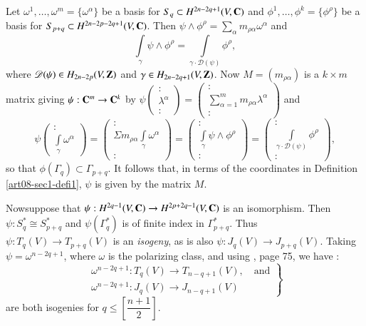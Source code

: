 Let $\omega^{1},\ldots,\omega^{m}=\{\omega^{\alpha}\}$ be a basis for $S_{q}\subset H^{2n-2q+1}(V,\mathbf{C})$ and $\phi^{1},\ldots,\phi^{k}=\{\phi^{\rho}\}$ be a basis for $S_{p+q}\subset H^{2n-2p-2q+1}(V,\mathbf{C})$. Then $\psi\wedge \phi^{\rho}=\sum\limits_{\alpha}m_{\rho\alpha}\omega^{\alpha}$ and 
\begin{equation}
\int\limits_{\gamma}\psi \wedge \phi^{\rho}=\int\limits_{\gamma\cdot \mathscr{D}(\psi)}\phi^{\rho},\label{art08-sec2-eq2.8}
\end{equation}
where $\mathscr{D}(\psi)\in H_{2n-2p}(V,\mathbf{Z})$ and $\gamma\in H_{2n-2q+1}(V,\mathbf{Z})$. Now $M=(m_{\rho\alpha})$ is a $k\times m$ matrix giving $\psi:\mathbf{C}^{m}\to \mathbf{C}^{k}$ by $\psi \left(\begin{smallmatrix} :\\ \lambda^{\alpha} \\ :\end{smallmatrix}\right)=\left(\begin{smallmatrix} :\\ \sum\limits^{m}_{\alpha=1} m_{\rho\alpha}\lambda^{\alpha}\\ :\end{smallmatrix}\right)$
 and
$$
\psi\left(\begin{matrix} 
:\\ \int\limits_{\gamma}\omega^{\alpha}
\end{matrix}\right)
=
\left(\begin{matrix}
:\\
\Sigma m_{\rho\alpha}\int\limits_{\gamma}\omega^{\alpha}\\
:
\end{matrix}\right)
=
\left(\begin{matrix}
:\\
\int\limits_{\gamma}\psi \wedge \phi^{\rho}\\
:
\end{matrix}\right)
=
\left(\begin{matrix}
:\\
\int\limits_{\gamma\cdot \mathscr{D}(\psi)} \phi^{\rho}\\
:
\end{matrix}\right),
$$
so that $\phi(\Gamma_{q})\subset \Gamma_{p+q}$. It follows that, in terms of the coordinates in Definition \ref{art08-sec1-defi1}, $\psi$ is given by the matrix $M$.

Now\pageoriginale suppose that $\psi:H^{2q-1}(V,\mathbf{C})\to H^{2p+2q-1}(V,\mathbf{C})$ is an isomorphism. Then $\psi:S^{*}_{q}\cong S^{*}_{p+q}$ and $\psi(\Gamma^{*}_{q})$ is of finite index in $\Gamma^{*}_{p+q}$. Thus $\psi:T_{q}(V)\to T_{p+q}(V)$ is an {\em isogeny}, as is also $\psi:J_{q}(V)\to J_{p+q}(V)$. Taking $\psi=\omega^{n-2q+1}$, where $\omega$ is the polarizing class, and using \cite{art08-key23}, page 75, we have :
\begin{equation}
\left.
\begin{array}{c}
\omega^{n-2q+1}:T_{q}(V)\to T_{n-q+1}(V),\text{~~ and}\\[3pt]
\omega^{n-2q+1} : J_{q}(V)\to J_{n-q+1}(V)
\end{array}\right\}\label{art08-sec2-eq2.9}
\end{equation}
are both isogenies for $q\leq \left[\dfrac{n+1}{2}\right]$.

